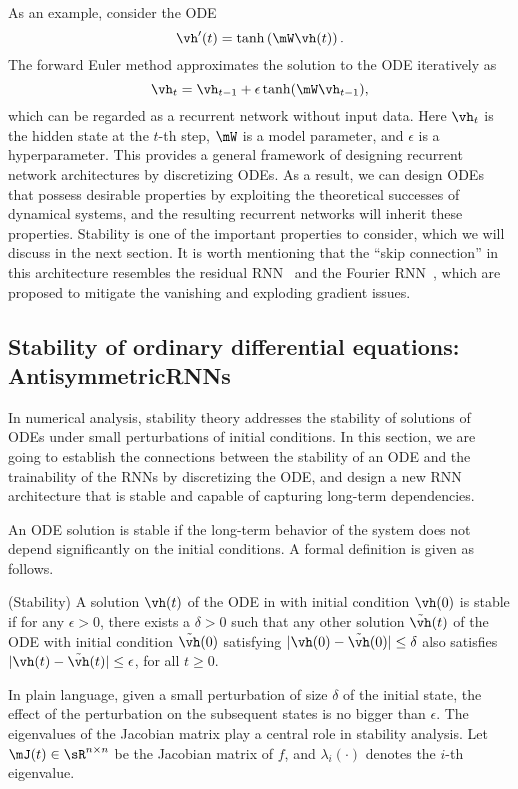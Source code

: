 As an example, consider the ODE
$$\vh'(t) = \tanh\left(\mW\vh(t)\right).$$
The forward Euler method approximates the solution to the ODE iteratively as
$$
    \vh_{t}
    =
    \vh_{t-1} + \epsilon \tanh(\mW \vh_{t-1}),    
$$
which can be regarded as a recurrent network without input data.  Here $\vh_t$ is the hidden state at the $t$-th step, $\mW$ is a model parameter, and $\epsilon$ is a hyperparameter.
This provides a general framework of designing recurrent network architectures by discretizing ODEs.
As a result, we can design ODEs that possess desirable properties by exploiting the theoretical successes of dynamical systems, and the resulting recurrent networks will inherit these properties.
Stability is one of the important properties to consider, which we will discuss in the next section.
It is worth mentioning that the ``skip connection'' in this architecture resembles the residual RNN~\citep{yue2018residual} and the Fourier RNN~\citep{zhang2018learning}, which are proposed to mitigate the vanishing and exploding gradient issues.



\subsection{Stability of ordinary differential equations: AntisymmetricRNNs}
\label{sec:ODE_theory}



In numerical analysis, stability theory addresses the stability of solutions of ODEs under small perturbations of initial conditions. In this section, we are going to establish the connections between the stability of an ODE and the trainability of the RNNs by discretizing the ODE, and design a new RNN architecture that is stable and capable of capturing long-term dependencies.


An ODE solution is stable if the long-term behavior of the system does not depend significantly on the initial conditions. 
A formal definition is given as follows.

\begin{definition} (Stability)
A solution $\vh(t)$ of the ODE in  with initial condition $\vh(0)$ is stable if
for any $\epsilon>0$, there exists a $\delta>0$ such that any other solution $\tilde{\vh}(t)$ of the ODE with initial condition $\tilde\vh(0)$ satisfying 
$|\vh(0) - \tilde{\vh}(0)| \leq \delta$ also satisfies $|\vh(t) - \tilde{\vh}(t)| \leq \epsilon$, for all $t \geq 0$. 
\end{definition}
In plain language, given a small perturbation of size $\delta$ of the initial state, the effect of the perturbation on the subsequent states is no bigger than $\epsilon$.
The eigenvalues of the Jacobian matrix play a central role in stability analysis.
Let $\mJ(t) \in \sR^{n \times n}$ be the Jacobian matrix of $f$, and $\lambda_i(\cdot)$ denotes the $i$-th eigenvalue.


